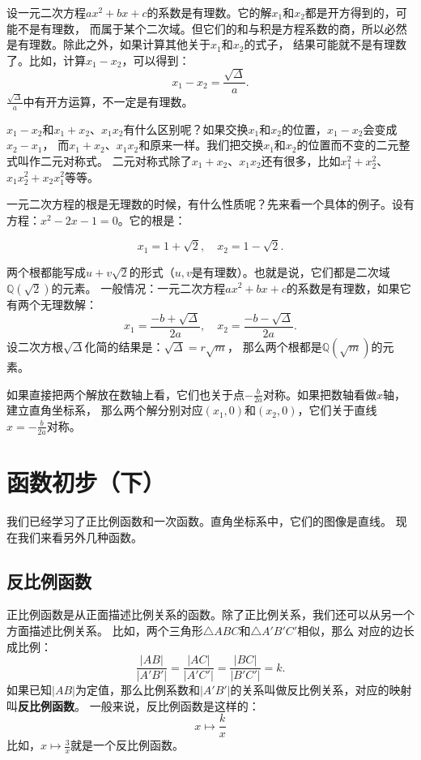 \documentclass[12pt,UTF8]{ctexbook}
\begin{document}
设一元二次方程$ax^2 + bx + c$的系数是有理数。它的解$x_1$和$x_2$都是开方得到的，可能不是有理数，
而属于某个二次域。但它们的和与积是方程系数的商，所以必然是有理数。除此之外，如果计算其他关于$x_1$和$x_2$的式子，
结果可能就不是有理数了。比如，计算$x_1 - x_2$，可以得到：
$$ x_1 - x_2 = \frac{\sqrt{\Delta}}{a}. $$
$\frac{\sqrt{\Delta}}{a}$中有开方运算，不一定是有理数。

$x_1 - x_2$和$x_1 + x_2$、$x_1x_2$有什么区别呢？如果交换$x_1$和$x_2$的位置，$x_1 - x_2$会变成$x_2 - x_1$，
而$x_1 + x_2$、$x_1x_2$和原来一样。我们把交换$x_1$和$x_2$的位置而不变的二元整式叫作二元对称式。
二元对称式除了$x_1 + x_2$、$x_1x_2$还有很多，比如$x_1^2 + x_2^2$、$x_1x_2^2 + x_2x_1^2$等等。

一元二次方程的根是无理数的时候，有什么性质呢？先来看一个具体的例子。设有方程：$x^2 - 2x - 1 = 0$。它的根是：

$$ x_1 = 1 + \sqrt{2}, \quad x_2 = 1 - \sqrt{2}.$$

两个根都能写成$u + v\sqrt{2}$的形式（$u,v$是有理数）。也就是说，它们都是二次域$\mathbb{Q}(\sqrt{2})$的元素。
一般情况：一元二次方程$ax^2 + bx + c$的系数是有理数，如果它有两个无理数解：
$$x_{1} = \frac{-b + \sqrt{\Delta}}{2a},\quad x_{2} = \frac{-b - \sqrt{\Delta}}{2a}.$$
设二次方根$\sqrt{\Delta}$化简的结果是：$\sqrt{\Delta} = r\sqrt{m}$，
那么两个根都是$\mathbb{Q}(\sqrt{m})$的元素。

如果直接把两个解放在数轴上看，它们也关于点$-\frac{b}{2a}$对称。如果把数轴看做$x$轴，建立直角坐标系，
那么两个解分别对应$(x_1, 0)$和$(x_2, 0)$，它们关于直线$x = -\frac{b}{2a}$对称。

\chapter{函数初步（下）}
我们已经学习了正比例函数和一次函数。直角坐标系中，它们的图像是直线。
现在我们来看另外几种函数。

\section{反比例函数}
正比例函数是从正面描述比例关系的函数。除了正比例关系，我们还可以从另一个方面描述比例关系。
比如，两个三角形$\triangle ABC$和$\triangle A'B'C'$相似，那么
对应的边长成比例：
$$ \frac{|AB|}{|A'B'|} = \frac{|AC|}{|A'C'|} = \frac{|BC|}{|B'C'|} = k.$$
如果已知$|AB|$为定值，那么比例系数和$|A'B'|$的关系叫做反比例关系，对应的映射叫\textbf{反比例函数}。
一般来说，反比例函数是这样的：
$$ x \mapsto \frac{k}{x}$$
比如，$x \mapsto \frac{3}{x}$就是一个反比例函数。
\end{document}
